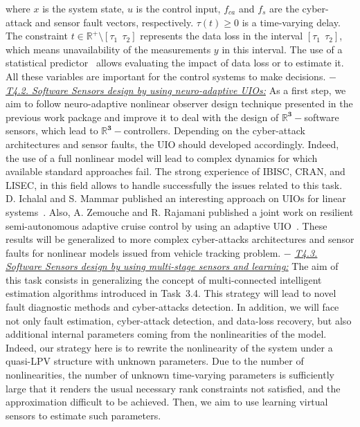 \documentclass[a4paper,11pt]{article}
\begin{document}
\begin{itemize}[leftmargin=.2in,noitemsep,nolistsep]
\begin{subequations}
\end{subequations}
where $x$ is the system state, $u$ is the control input, $f_{ca}$ and $f_{s}$ are the cyber-attack and sensor fault vectors, respectively. $\tau(t)\geq 0$ is a time-varying delay. The constraint $t\in \mathbb{R}^{+}\setminus [\tau_1~~\tau_2]$ represents the data loss in the interval $[\tau_1~~\tau_2]$, which means unavailability of the measurements $y$ in this interval. The use of a statistical predictor~\cite{Ghani-doi:10.1080/02664763.2019.1633286} allows evaluating the impact of data loss or to estimate it. All these variables are important for the control systems to make decisions.
%
\subitem$-$ \underline{\it T4.2. Software Sensors design by using neuro-adaptive UIOs:} %
As a first step, we aim to follow neuro-adaptive nonlinear observer design technique presented in the previous work package and improve it to deal with the design of $\pmb{\mathbb{R}^{3}}-$software sensors, which lead to $\pmb{\mathbb{R}^{3}}-$controllers. Depending on the cyber-attack architectures and sensor faults, the UIO should developed accordingly. Indeed, the use of a full nonlinear model will lead to complex dynamics for which available standard approaches fail. The strong experience of IBISC, CRAN, and LISEC, in this field allows to handle successfully the issues related to this task. D. Ichalal and S. Mammar published an interesting approach on UIOs for linear systems~\cite{ichalal2019unknown}. Also, A. Zemouche and R. Rajamani published a joint work on resilient semi-autonomous adaptive cruise control by using an adaptive UIO~\cite{Jeon_10.1115/DSCC2019-9096}. These results will be generalized to more complex cyber-attacks architectures and sensor faults for nonlinear models issued from vehicle tracking problem.
\subitem$-$  \underline{\it T4.3. Software Sensors design by using multi-stage sensors and learning:} 
The aim of this task consists in generalizing the concept of multi-connected intelligent estimation algorithms introduced in Task~3.4. This strategy will lead to novel fault diagnostic methods and cyber-attacks detection. In addition, we will face not only fault estimation, cyber-attack detection, and data-loss recovery, but also additional internal parameters coming from the nonlinearities of the model. Indeed, our strategy here is to rewrite the nonlinearity of the system under a quasi-LPV structure with unknown parameters. Due to the number of nonlinearities, the number of unknown time-varying parameters is sufficiently large that it renders the usual necessary rank constraints not satisfied, and the approximation difficult to be achieved. Then, we aim to use learning virtual sensors to estimate such parameters. %


\end{itemize}
\end{document}
